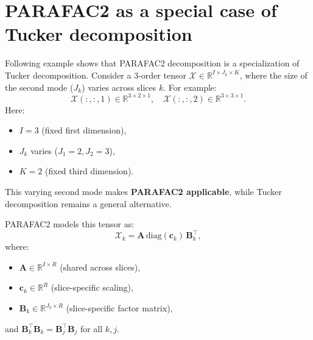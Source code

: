 \appendix

\section{ PARAFAC2 as a special case of Tucker decomposition}
    Following example shows that PARAFAC2 decomposition is a specialization of Tucker decomposition. Consider a 3-order tensor \( \mathcal{X} \in \mathbb{R}^{I \times J_k \times K} \), where the size of the second mode (\( J_k \)) varies across slices \( k \). For example:
    \[
    \mathcal{X}(:,:,1) \in \mathbb{R}^{3 \times 2 \times 1}, \quad
    \mathcal{X}(:,:,2) \in \mathbb{R}^{3 \times 3 \times 1}.
    \]
    Here:
    \begin{itemize}
        \item \( I = 3 \) (fixed first dimension),
        \item \( J_k \) varies (\( J_1 = 2, J_2 = 3 \)),
        \item \( K = 2 \) (fixed third dimension).
    \end{itemize}
    
    This varying second mode makes \textbf{PARAFAC2 applicable}, while Tucker decomposition remains a general alternative.
    
    PARAFAC2 models this tensor as:
    \[
    \mathcal{X}_k = \mathbf{A} \, \text{diag}(\mathbf{c}_k) \, \mathbf{B}_k^\top,
    \]
    where:
    \begin{itemize}
        \item \( \mathbf{A} \in \mathbb{R}^{I \times R} \) (shared across slices),
        \item \( \mathbf{c}_k \in \mathbb{R}^{R} \) (slice-specific scaling),
        \item \( \mathbf{B}_k \in \mathbb{R}^{J_k \times R} \) (slice-specific factor matrix),
    \end{itemize}
    and \( \mathbf{B}_k^\top \mathbf{B}_k = \mathbf{B}_j^\top \mathbf{B}_j \) for all \( k, j \). 
    
    
